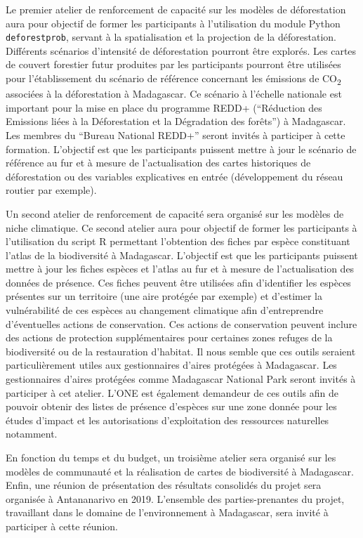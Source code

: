 \documentclass[12pt,]{article}
\begin{document}
Le premier atelier de renforcement de capacité sur les modèles de
déforestation aura pour objectif de former les participants à
l'utilisation du module Python \texttt{deforestprob}, servant à la
spatialisation et la projection de la déforestation. Différents
scénarios d'intensité de déforestation pourront être explorés. Les
cartes de couvert forestier futur produites par les participants
pourront être utilisées pour l'établissement du scénario de référence
concernant les émissions de CO\textsubscript{2} associées à la
déforestation à Madagascar. Ce scénario à l'échelle nationale est
important pour la mise en place du programme REDD+ (``Réduction des
Emissions liées à la Déforestation et la Dégradation des forêts'') à
Madagascar. Les membres du ``Bureau National REDD+'' seront invités à
participer à cette formation. L'objectif est que les participants
puissent mettre à jour le scénario de référence au fur et à mesure de
l'actualisation des cartes historiques de déforestation ou des variables
explicatives en entrée (développement du réseau routier par exemple).

Un second atelier de renforcement de capacité sera organisé sur les
modèles de niche climatique. Ce second atelier aura pour objectif de
former les participants à l'utilisation du script R permettant
l'obtention des fiches par espèce constituant l'atlas de la biodiversité
à Madagascar. L'objectif est que les participants puissent mettre à jour
les fiches espèces et l'atlas au fur et à mesure de l'actualisation des
données de présence. Ces fiches peuvent être utilisées afin d'identifier
les espèces présentes sur un territoire (une aire protégée par exemple)
et d'estimer la vulnérabilité de ces espèces au changement climatique
afin d'entreprendre d'éventuelles actions de conservation. Ces actions
de conservation peuvent inclure des actions de protection
supplémentaires pour certaines zones refuges de la biodiversité ou de la
restauration d'habitat. Il nous semble que ces outils seraient
particulièrement utiles aux gestionnaires d'aires protégées à
Madagascar. Les gestionnaires d'aires protégées comme Madagascar
National Park seront invités à participer à cet atelier. L'ONE est
également demandeur de ces outils afin de pouvoir obtenir des listes de
présence d'espèces sur une zone donnée pour les études d'impact et les
autorisations d'exploitation des ressources naturelles notamment.

En fonction du temps et du budget, un troisième atelier sera organisé
sur les modèles de communauté et la réalisation de cartes de
biodiversité à Madagascar. Enfin, une réunion de présentation des
résultats consolidés du projet sera organisée à Antananarivo en 2019.
L'ensemble des parties-prenantes du projet, travaillant dans le domaine
de l'environnement à Madagascar, sera invité à participer à cette
réunion.
\end{document}
